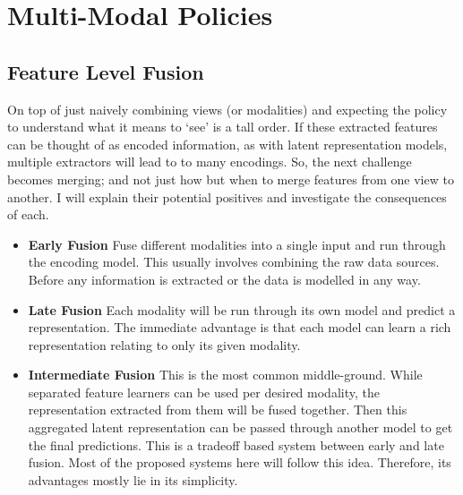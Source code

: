 \section{Multi-Modal Policies}\label{sec:multi-modal-policies}

\subsection{Feature Level Fusion}
On top of just naively combining views (or modalities) and expecting the policy to understand what it means to `see' is a tall order. If these extracted features can be thought of as encoded information, as with latent representation models, multiple extractors will lead to to many encodings. So, the next challenge becomes merging; and not just how but when to merge features from one view to another. I will explain their potential positives and investigate the consequences of each.
\begin{itemize}
  \itemsep0em
  \item\textbf{Early Fusion}
  Fuse different modalities into a single input and run through the encoding model. This usually involves combining the raw data sources. Before any information is extracted or the data is modelled in any way.
  
  \item\textbf{Late Fusion}
  Each modality will be run through its own model and predict a representation. The immediate advantage is that each model can learn a rich representation relating to only its given modality.
  
  \item\textbf{Intermediate Fusion}
  This is the most common middle-ground. While separated feature learners can be used per desired modality, the representation extracted from them will be fused together. Then this aggregated latent representation can be passed through another model to get the final predictions. This is a tradeoff based system between early and late fusion. Most of the proposed systems here will follow this idea. Therefore, its advantages mostly lie in its simplicity. 
\end{itemize}
  
